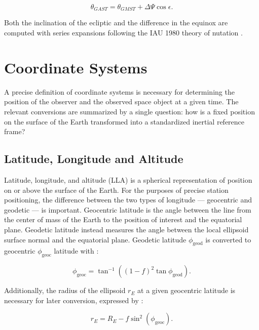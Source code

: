 \begin{equation} \label{eq:date_to_gast}
  \theta_{GAST} = \theta_{GMST} + \Delta \Psi \cos\epsilon.
\end{equation}

Both the inclination of the ecliptic and the difference in the equinox are computed with series expansions following the IAU 1980 theory of nutation \cite{vallado4ed}.

\section{Coordinate Systems}

A precise definition of coordinate systems is necessary for determining the position of the observer and the observed space object at a given time. The relevant conversions are summarized by a single question: how is a fixed position on the surface of the Earth transformed into a standardized inertial reference frame?

\subsection{Latitude, Longitude and Altitude}

Latitude, longitude, and altitude (LLA) is a spherical representation of position on or above the surface of the Earth. For the purposes of precise station positioning, the difference between the two types of longitude --- geocentric and geodetic --- is important. Geocentric latitude is the angle between the line from the center of mass of the Earth to the position of interest and the equatorial plane. Geodetic latitude instead measures the angle between the local ellipsoid surface normal and the equatorial plane. Geodetic latitude $\phi_\mathrm{geod}$ is converted to geocentric $\phi_\mathrm{geoc}$ latitude with \cite{frueh2019notes}:

\begin{equation} \label{eq:geod_to_geoc}
  \phi_\mathrm{geoc} = \tan^{-1} \left((1 - f)^2 \tan\phi_\mathrm{geod} \right).
\end{equation}

Additionally, the radius of the ellipsoid $r_E$ at a given geocentric latitude is necessary for later conversion, expressed by \cite{frueh2019notes}:

\begin{equation} \label{eq:rad_at_geoc}
  r_E = R_E - f \sin^2 \left( \phi_\mathrm{geoc} \right).
\end{equation}

